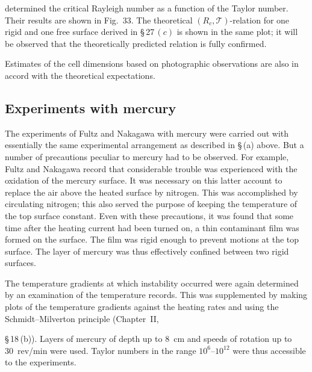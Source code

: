 \noindent determined the critical Rayleigh number as a function of the Taylor
number.  Their results are shown in Fig.~33.  The theoretical $(R_c, \mathscr{T})$-relation
for one rigid and one free surface derived in \S\,27\,$(c)$ is shown in
the same plot; it will be observed that the theoretically predicted relation
is fully confirmed.

Estimates of the cell dimensions based on photographic observations
are also in accord with the theoretical expectations.

\subsection{Experiments with mercury}
\label{sec:35b}

The experiments of Fultz and Nakagawa with mercury were carried
out with essentially the same experimental arrangement as described
in \S\,(a) above.  But a number of precautions peculiar to mercury had to
be observed.  For example, Fultz and Nakagawa record that considerable
trouble was experienced with the oxidation of the mercury surface.  It
was necessary on this latter account to replace the air above the heated
surface by nitrogen.  This was accomplished by circulating nitrogen;
this also served the purpose of keeping the temperature of the top surface
constant.  Even with these precautions, it was found that some time after
the heating current had been turned on, a thin contaminant film was
formed on the surface.  The film was rigid enough to prevent motions at
the top surface.  The layer of mercury was thus effectively confined
between two rigid surfaces.

The temperature gradients at which instability occurred were again
determined by an examination of the temperature records.  This was
supplemented by making plots of the temperature gradients against the
heating rates and using the Schmidt--Milverton principle (Chapter~II,


\noindent \S\,18\,(b)).  Layers of mercury of depth up to 8~cm and speeds of rotation
up to 30~rev/min were used.  Taylor numbers in the range $10^6$--$10^{12}$ were
thus accessible to the experiments.

